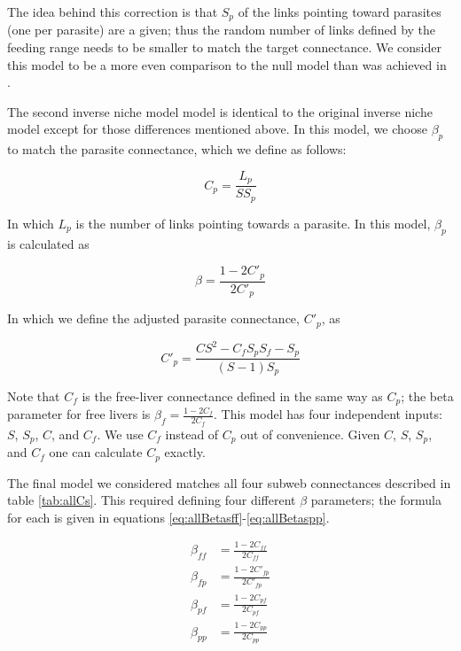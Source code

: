 \documentclass[/home/nkappler/Research/Dissertation/
 dissertation.tex]{subfiles}
\begin{document}
\begin{bibunit}
The idea behind this correction is that $S_p$ of the links pointing toward
parasites (one per parasite) are a given; thus the random number of links
defined by the feeding range needs to be smaller to match the target
connectance. We consider this model to be a more even comparison to the null
model than was achieved in \cite*{Warren2010}.

The second inverse niche model model is identical to the original inverse niche
model except for those differences mentioned above. In this model, we choose
$\beta_p$ to match the parasite connectance, which we define as follows:

\begin{equation}
    C_{p} = \frac{L_{ p}}{SS_p}\label{eq:Cf}
\end{equation}

In which $L_{p}$ is the number of links pointing towards a parasite. In
this model, $\beta_p$ is calculated as

\begin{equation}
    \beta = \frac{1-2C'_{ p}}{2C'_{ p}}\label{eq:beta2}
\end{equation}

In which we define the adjusted parasite connectance, $C'_{ p}$, as

\begin{equation}
    C'_{ p}=\frac{CS^2 - C_{ f}S_pS_f - S_p}{(S-1)S_p}\label{eq:CpAdj}
\end{equation}

Note that $C_{ f}$  is the free-liver connectance defined in the same way as
$C_{ p}$; the beta parameter for free livers is $\beta_f=\frac{1-2C_f}{2C_f}$.
This model has four independent inputs: $S$, $S_p$, $C$, and $C_f$. We use
$C_f$ instead of $C_p$ out of convenience. Given $C$, $S$, $S_p$, and $C_f$ one
can calculate $C_p$ exactly.

The final model we considered matches all four subweb connectances described in
table \ref{tab:allCs}. This required defining four different $\beta$
parameters; the formula for each is given in equations
\ref{eq:allBetasff}-\ref{eq:allBetaspp}.

\begin{align}
    \beta_{f\!f} &= \frac{1-2C_{f\!f}}{2C_{f\!f}}\label{eq:allBetasff}\\
    \beta_{f\!p} &= \frac{1-2C'_{f\!p}}{2C'_{f\!p}}\\
    \beta_{p\!f} &= \frac{1-2C_{p\!f}}{2C_{p\!f}}\\
    \beta_{pp} &= \frac{1-2C_{pp}}{2C_{pp}}\label{eq:allBetaspp}
\end{align}


\end{bibunit}
\end{document}
